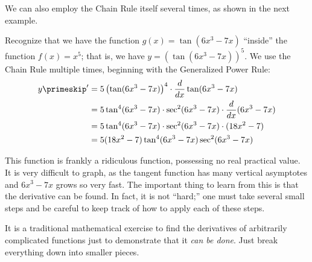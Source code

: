 We can also employ the Chain Rule itself several times, as shown in the next example.

{Recognize that we have the function $g(x)=\tan(6x^3-7x)$ ``inside'' the function $f(x) = x^5$; that is, we have $y=\left(\tan(6x^3-7x)\right)^5$. We use the Chain Rule multiple times, beginning with the Generalized Power Rule:
\begin{align*}
y\primeskip' &= 5\left(\tan(6x^3-7x)\right)^4 \cdot \frac{d}{dx} \tan(6x^3-7x)\\
&= 5\tan^4(6x^3-7x) \cdot \sec^2 (6x^3-7x) \cdot \frac{d}{dx}(6x^3-7x) \\
&= 5\tan^4 (6x^3-7x) \cdot \sec^2 (6x^3-7x) \cdot (18x^2-7)\\
&= 5(18x^2-7)\tan^4 (6x^3-7x) \sec^2 (6x^3-7x) \\
\end{align*}

This function is frankly a ridiculous function, possessing no real practical value. It is very difficult to graph, as the tangent function has many vertical asymptotes and $6x^3-7x$ grows so very fast. The important thing to learn from this is that the derivative can be found. In fact, it is not ``hard;'' one must take several small steps and be careful to keep track of how to apply each of these steps.%
}

It is a traditional mathematical exercise to find the derivatives of arbitrarily complicated functions just to demonstrate that it \textit{can be done}. Just break everything down into smaller pieces.


